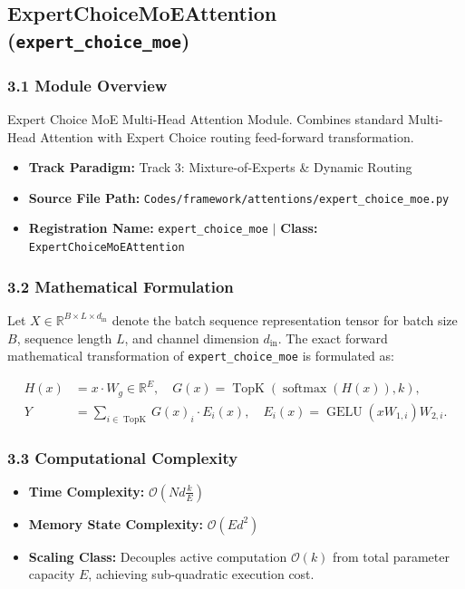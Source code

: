 \subsection{ExpertChoiceMoEAttention (\texttt{expert\_choice\_moe})}
\label{sec:app_module_expert_choice_moe}

\subsubsection*{3.1 Module Overview}
Expert Choice MoE Multi-Head Attention Module. Combines standard Multi-Head Attention with Expert Choice routing feed-forward transformation.
\begin{itemize}
    \item \textbf{Track Paradigm:} Track 3: Mixture-of-Experts \& Dynamic Routing
    \item \textbf{Source File Path:} \texttt{Codes/framework/attentions/expert\_choice\_moe.py}
    \item \textbf{Registration Name:} \texttt{expert\_choice\_moe} $\mid$ \textbf{Class:} \texttt{ExpertChoiceMoEAttention}
\end{itemize}

\subsubsection*{3.2 Mathematical Formulation}
Let $X \in \mathbb{R}^{B \times L \times d_{\text{in}}}$ denote the batch sequence representation tensor for batch size $B$, sequence length $L$, and channel dimension $d_{\text{in}}$. The exact forward mathematical transformation of \texttt{expert\_choice\_moe} is formulated as:

\begin{align}
H(x) &= x \cdot W_g \in \mathbb{R}^{E}, \quad G(x) = \operatorname{TopK}\left(\operatorname{softmax}(H(x)), k\right), \\
Y &= \sum_{i \in \operatorname{TopK}} G(x)_i \cdot E_i(x), \quad E_i(x) = \operatorname{GELU}(x W_{1, i}) W_{2, i}.
\end{align}


\subsubsection*{3.3 Computational Complexity}
\begin{itemize}
    \item \textbf{Time Complexity:} $\mathcal{O}(N d \frac{k}{E})$
    \item \textbf{Memory State Complexity:} $\mathcal{O}(E d^2)$
    \item \textbf{Scaling Class:} Decouples active computation $\mathcal{O}(k)$ from total parameter capacity $E$, achieving sub-quadratic execution cost.
\end{itemize}

